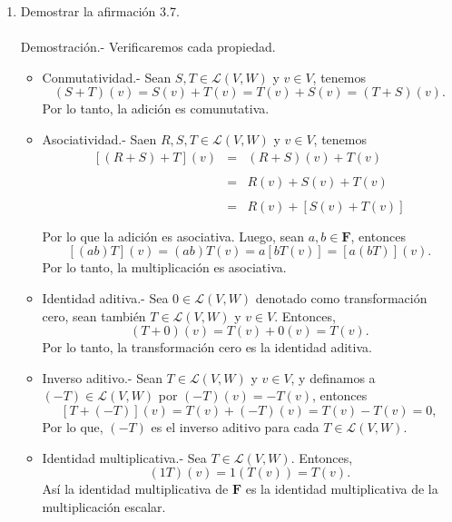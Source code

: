 \begin{enumerate}[\bfseries 1.]
	\item  Demostrar la afirmación 3.7.\\\\
	    Demostración.-\; Verificaremos cada propiedad.

	    \begin{itemize}

		\item Conmutatividad.- Sean $S,T\in \mathcal{L}(V,W)$ y $v\in V$, tenemos
		    $$(S+T)(v)=S(v)+T(v)=T(v)+S(v)=(T+S)(v).$$
		    Por lo tanto, la adición es comunutativa.\\

		\item Asociatividad.- Saen $R,S,T\in \mathcal{L}(V,W)$ y $v\in V$, tenemos
		    $$
		    \begin{array}{rcl}
			\left[(R+S)+T\right](v) &=& (R+S)(v)+T(v)\\\\
						&=& R(v)+S(v)+T(v)\\\\
						&=& R(v)+\left[S(v)+T(v)\right]\\\\
		    \end{array}
		    $$
		    Por lo que la adición es asociativa. Luego, sean $a,b\in \textbf{F}$, entonces
		    $$\left[(ab)T\right](v)=(ab)T(v)=a\left[bT(v)\right]=\left[a(bT)\right](v).$$
		    Por lo tanto, la multiplicación es asociativa.\\

		\item Identidad aditiva.- Sea $0\in \mathcal{L}(V,W)$ denotado como transformación cero, sean también $T\in \mathcal{L}(V,W)$ y $v\in V$. Entonces,
		    $$(T+0)(v)=T(v)+0(v)=T(v).$$
		    Por lo tanto, la transformación cero es la identidad aditiva.\\

		\item Inverso aditivo.- Sean $T\in \mathcal{L}(V,W)$ y $v\in V$, y definamos a $(-T)\in \mathcal{L}(V,W)$ por $(-T)(v)=-T(v)$, entonces
		    $$\left[T+(-T)\right](v)=T(v)+(-T)(v)=T(v)-T(v)=0,$$
		    Por lo que, $(-T)$ es el inverso aditivo para cada $T\in \mathcal{L}(V,W)$.\\

		\item Identidad multiplicativa.- Sea $T\in \mathcal{L}(V,W)$. Entonces,
		    $$(1T)(v)=1(T(v))=T(v).$$
		    Así la identidad multiplicativa de $\textbf{F}$ es la identidad multiplicativa de la multiplicación escalar.\\


\end{itemize}
\end{enumerate}
